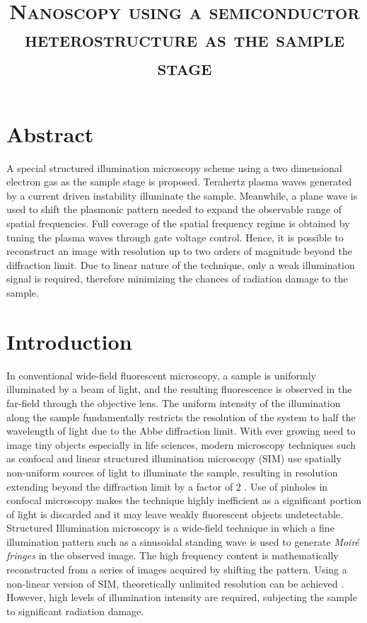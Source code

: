 \documentclass[11pt]{article}
\begin{document}
\title{\textsc{Nanoscopy using a semiconductor heterostructure as the sample stage}}

\maketitle


\section{Abstract}
%
A special structured illumination microscopy scheme using a two dimensional electron gas as the sample stage is proposed. Terahertz plasma waves generated by a current driven instability illuminate the sample. Meanwhile, a plane wave is used to shift the plasmonic pattern needed to expand the observable range of spatial frequencies. Full coverage of the spatial frequency regime is obtained by tuning the plasma waves through gate voltage control. Hence, it is possible to reconstruct an image with resolution up to two orders of magnitude beyond the diffraction limit. Due to linear nature of the technique, only a weak illumination signal is required, therefore minimizing the chances of radiation damage to the  sample.
%
\section{Introduction}
%
In conventional wide-field fluorescent microscopy, a sample is uniformly illuminated by a beam of light, and the resulting fluorescence is observed in the far-field through the objective lens. The uniform intensity of the illumination along the sample fundamentally restricts the resolution of the system to half the wavelength of light due to the Abbe diffraction limit. With ever growing need to image tiny objects especially in life sciences, modern microscopy techniques such as confocal and linear structured illumination microscopy (SIM) use spatially non-uniform sources of light to illuminate the sample, resulting in resolution extending beyond the diffraction limit by a factor of $2$ \cite{Minsky1988,Gustafsson2000}. Use of pinholes in confocal microscopy makes the technique highly inefficient as a significant portion of light is discarded and it may leave weakly fluorescent objects undetectable. Structured Illumination microscopy is a wide-field technique in which a fine illumination pattern such as a sinusoidal standing wave is used to generate \emph{Moiré fringes} in the observed image. The high frequency content is mathematically reconstructed from a series of images acquired by shifting the pattern. Using a non-linear version of SIM, theoretically unlimited resolution can be achieved \cite{Gustafsson_2005}. However, high levels of illumination intensity are required, subjecting the sample to significant radiation damage.
\end{document}
